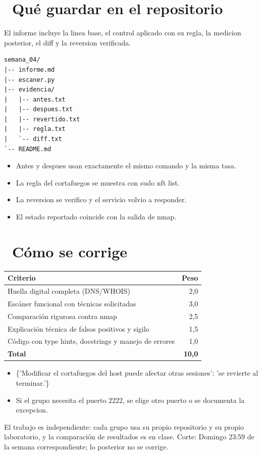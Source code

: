 \documentclass[11pt,a4paper]{article}
\newcommand{\iconotexto}[2]{\textcolor{cyanNeon}{\faIcon{#1}}~#2}
\begin{document}
\section{\iconotexto{box-open}{Qué guardar en el repositorio}}

El informe incluye la linea base, el control aplicado con su regla, la medicion posterior, el diff y la reversion verificada.

\begin{lstlisting}[style=estiloCodigo]
semana_04/
|-- informe.md
|-- escaner.py
|-- evidencia/
|   |-- antes.txt
|   |-- despues.txt
|   |-- revertido.txt
|   |-- regla.txt
|   `-- diff.txt
`-- README.md
\end{lstlisting}

\begin{itemize}[leftmargin=1.4em,itemsep=2pt,topsep=3pt]
  \item Antes y despues usan exactamente el mismo comando y la misma tasa.
  \item La regla del cortafuegos se muestra con sudo nft list.
  \item La reversion se verifico y el servicio volvio a responder.
  \item El estado reportado coincide con la salida de nmap.
\end{itemize}

\section{\iconotexto{ruler-combined}{Cómo se corrige}}

\begin{tabularx}{\linewidth}{@{}X r@{}}
\toprule
Criterio & Peso\\
\midrule
Huella digital completa (DNS/WHOIS) & 2,0 \\
Escáner funcional con técnicas solicitadas & 3,0 \\
Comparación rigurosa contra nmap & 2,5 \\
Explicación técnica de falsos positivos y sigilo & 1,5 \\
Código con type hints, docstrings y manejo de errores & 1,0 \\
\midrule
\textbf{Total} & \textbf{10,0}\\
\bottomrule
\end{tabularx}

\begin{itemize}[leftmargin=1.4em,itemsep=2pt,topsep=3pt]
  \item \{'Modificar el cortafuegos del host puede afectar otras sesiones': 'se revierte al terminar.'\}
  \item Si el grupo necesita el puerto 2222, se elige otro puerto o se documenta la excepcion.
\end{itemize}

\begin{cajaRecuerda}El trabajo es independiente: cada grupo usa su propio repositorio y su propio laboratorio, y la comparación de resultados es en clase. Corte: Domingo 23:59 de la semana correspondiente; lo posterior no se corrige.
\end{cajaRecuerda}
\end{document}
